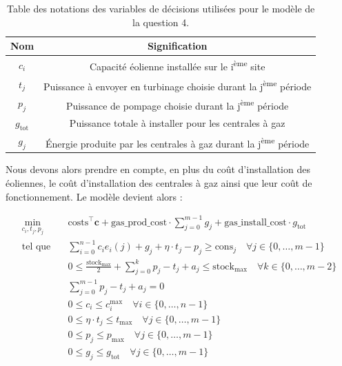\documentclass{article}
\begin{document}
\begin{table}[h!]
    \centering
    \renewcommand{\arraystretch}{1.5}%
    \begin{tabular}{|c || c |} 
        \hline
        Nom & Signification\\
        \hline\hline
        $c_i$ & Capacité éolienne installée sur le i\textsuperscript{ème} site\\
        $t_j$ & Puissance à envoyer en turbinage choisie durant la j\textsuperscript{ème} période\\
        $p_j$ & Puissance de pompage choisie durant la j\textsuperscript{ème} période\\
        $g_\mathrm{tot}$ & Puissance totale à installer pour les centrales à gaz\\
        $g_j$ & \'Energie produite par les centrales à gaz durant la j\textsuperscript{ème} période\\
        \hline
    \end{tabular}
    \caption{Table des notations des variables de décisions utilisées pour le modèle de la question 4.} 
    \label{table:notations_variables_6}
\end{table}

\noindent Nous devons alors prendre en compte, en plus du coût d'installation des éoliennes, le coût d'installation des centrales à gaz ainsi que leur coût de fonctionnement.
Le modèle devient alors :

\begin{align}
    \min_{c_{i},t_j,p_j} \quad &\mathrm{costs}^\intercal\mathbf{c} + \mathrm{gas\_prod\_cost}\cdot \sum_{j=0}^{m-1} g_j + \mathrm{gas\_install\_cost} \cdot g_\mathrm{tot}\nonumber\\
    \textrm{tel que} \quad & \sum_{i=0}^{n-1} c_i e_i(j) + g_j + \eta \cdot t_j - p_j \ge \mathrm{cons}_j \quad \forall j \in  \{ 0, \ldots, m-1 \}\label{eq:6_contr1}\\
    & 0 \le \frac{\mathrm{stock}_\mathrm{max}}{2}  + \sum_{j=0}^{k} p_j - t_j + a_j \le  \mathrm{stock}_\mathrm{max} \quad \forall k \in \{ 0, \ldots, m-2 \}\label{eq:6_contr2}\\
    & \sum_{j=0}^{m-1} p_j - t_j + a_j = 0 \label{eq:6_contr3}\\
    & 0 \le c_i \le c_i^\mathrm{max} \quad \forall i \in  \{ 0, \ldots, n-1 \}  \label{eq:6_contr4}\\
    & 0 \le \eta \cdot t_j \le  t_\mathrm{max} \quad \forall j \in  \{ 0, \ldots, m-1 \}  \label{eq:6_contr5}\\
    & 0 \le p_j \le  p_\mathrm{max} \quad \forall j \in  \{ 0, \ldots, m-1 \} \label{eq:6_contr6}\\
    & 0 \le g_j \le g_\mathrm{tot} \quad \forall j \in  \{ 0, \ldots, m-1 \} \label{eq:6_contr7}
\end{align}
\end{document}
